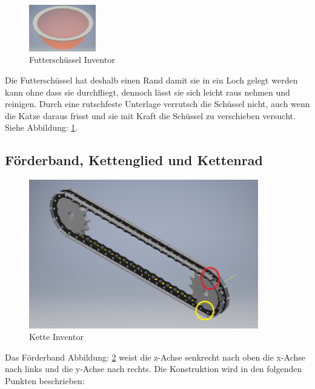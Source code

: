 \begin{figure}
\vspace{-20pt}
  \begin{center}
    \includegraphics[width=0.26\textwidth]{Bilder/Inventor/Schuessel}
  \end{center}
  \caption{Futterschüssel Inventor}
  \label{Futterschuessel_Inventor}
  \vspace{-40pt}
\end{figure}

Die Futterschüssel hat deshalb einen Rand damit sie in ein Loch gelegt werden kann ohne dass sie durchfliegt, dennoch lässt sie sich leicht raus nehmen und reinigen. Durch eine rutschfeste Unterlage verrutsch die Schüssel nicht, auch wenn die Katze daraus frisst und sie mit Kraft die Schüssel zu verschieben versucht. Siehe Abbildung: \ref{Futterschuessel_Inventor}.

\subsection{Förderband, Kettenglied und Kettenrad}

\begin{figure}[H]
\begin{center}
\includegraphics[width=10cm]{Bilder/Inventor/Kette}
\caption{Kette Inventor}
\label{Kette_Inventor} 
\end{center}
\end{figure}


Das Förderband Abbildung: \ref{Kette_Inventor} weist die z-Achse senkrecht nach oben die x-Achse nach links und die y-Achse nach rechts. Die Konstruktion wird in den folgenden Punkten beschrieben:

